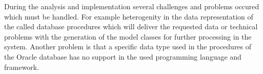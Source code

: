 During the analysis and implementation several challenges and problems occured which must be handled. For example heterogenity in the data representation of the called database procedures which will deliver the requested data or technical problems with the generation of the model classes for further processing in the system. Another problem is that a specific data type used in the procedures of the Oracle database has no support in the used programming language and framework.  
 
